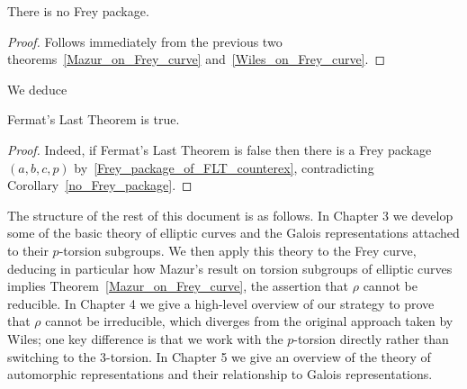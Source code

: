 \begin{corollary}\label{no_Frey_package}\leanok There is no Frey package.\end{corollary}
\begin{proof}\leanok Follows immediately from the previous two theorems~\ref{Mazur_on_Frey_curve} and~\ref{Wiles_on_Frey_curve}.\end{proof}

We deduce

\begin{corollary}\label{FLT}\leanok Fermat's Last Theorem is true.\end{corollary}
\begin{proof}\leanok
Indeed, if Fermat's Last Theorem is false then there is a Frey package $(a,b,c,p)$ by~\ref{Frey_package_of_FLT_counterex}, contradicting Corollary~\ref{no_Frey_package}.
\end{proof}

The structure of the rest of this document is as follows. In Chapter 3 we develop some of the basic theory of elliptic curves and the Galois representations attached to their $p$-torsion subgroups. We then apply this theory to the Frey curve, deducing in particular how Mazur's result on torsion subgroups of elliptic curves implies Theorem~\ref{Mazur_on_Frey_curve}, the assertion that $\rho$ cannot be reducible. In Chapter 4 we give a high-level overview of our strategy to prove that $\rho$ cannot be irreducible, which diverges from the original approach taken by Wiles; one key difference is that we work with the $p$-torsion directly rather than switching to the 3-torsion. In Chapter 5 we give an overview of the theory of automorphic representations and their relationship to Galois representations. 
